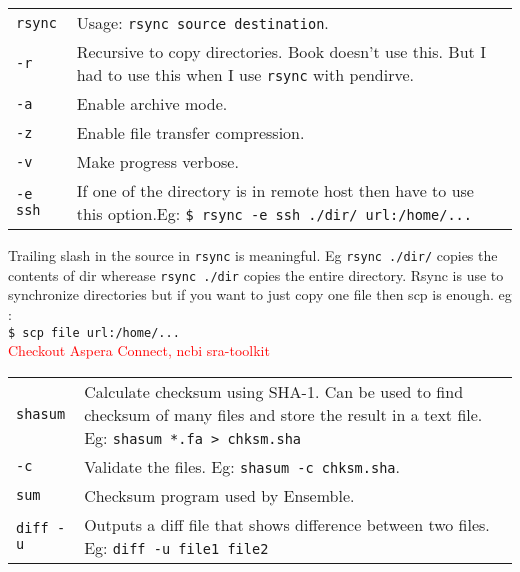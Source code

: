 \begin{tabularx}{\linewidth}{lX}
\hline
\texttt{rsync} & Usage: \texttt{rsync source destination}.\\
\texttt{-r} & Recursive to copy directories. Book doesn't use this. But I had to use this when I use \texttt{rsync} with pendirve.\\
\texttt{-a} & Enable archive mode.\\
\texttt{-z} & Enable file transfer compression.\\
\texttt{-v} & Make progress verbose.\\
\texttt{-e ssh} & If one of the directory is in remote host then have to use this option.Eg: \texttt{\$ rsync -e ssh ./dir/ url:/home/...}\\
\hline
\end{tabularx}
Trailing slash in the source in \texttt{rsync} is meaningful. Eg \texttt{rsync ./dir/} copies the contents of dir wherease \texttt{rsync ./dir} copies the entire directory. Rsync is use to synchronize directories but if you want to just copy one file then scp is enough. eg :\\ \texttt{\$ scp file url:/home/...}\\
\textcolor{red}{Checkout Aspera Connect, ncbi sra-toolkit}

\begin{tabularx}{\linewidth}{lX}
\hline
\texttt{shasum} & Calculate checksum using SHA-1. Can be used to find checksum of many files and store the result in a text file. Eg: \texttt{shasum *.fa > chksm.sha}\\
\texttt{-c} & Validate the files. Eg: \texttt{shasum -c chksm.sha}.\\
\texttt{sum} & Checksum program used by Ensemble.\\
\texttt{diff -u} & Outputs a diff file that shows difference between two files. Eg: \texttt{diff -u file1 file2}\\
\hline
\end{tabularx}

\vfill \null
\columnbreak

